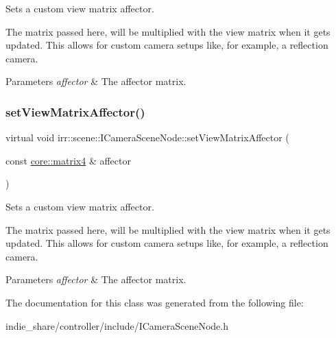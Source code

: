 Sets a custom view matrix affector. 

The matrix passed here, will be multiplied with the view matrix when it gets updated. This allows for custom camera setups like, for example, a reflection camera. 
\begin{DoxyParams}{Parameters}
{\em affector} & The affector matrix. \\
\hline
\end{DoxyParams}
\mbox{\label{classirr_1_1scene_1_1ICameraSceneNode_adb3500cac2a8a47e6a3f48aa343ce2fd}} 
\subsubsection{\texorpdfstring{set\+View\+Matrix\+Affector()}{setViewMatrixAffector()}\hspace{0.1cm}{\footnotesize\ttfamily [2/2]}}
{\footnotesize\ttfamily virtual void irr\+::scene\+::\+I\+Camera\+Scene\+Node\+::set\+View\+Matrix\+Affector (\begin{DoxyParamCaption}\item[{const \hyperlink{namespaceirr_1_1core_a4c9d4e29899535971052810954a14431}{core\+::matrix4} \&}]{affector }\end{DoxyParamCaption})\hspace{0.3cm}{\ttfamily [pure virtual]}}



Sets a custom view matrix affector. 

The matrix passed here, will be multiplied with the view matrix when it gets updated. This allows for custom camera setups like, for example, a reflection camera. 
\begin{DoxyParams}{Parameters}
{\em affector} & The affector matrix. \\
\hline
\end{DoxyParams}


The documentation for this class was generated from the following file\+:\begin{DoxyCompactItemize}
\item 
indie\+\_\+share/controller/include/I\+Camera\+Scene\+Node.\+h\end{DoxyCompactItemize}
